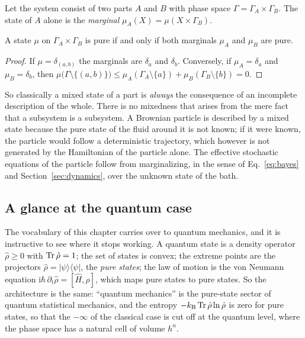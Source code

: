 Let the system consist of two parts $A$ and $B$ with phase space $\Gamma=\Gamma_A\times\Gamma_B$. The state of $A$ alone is the \emph{marginal} $\mu_A(X)=\mu(X\times\Gamma_B)$.

\begin{proposition}\label{prop:marginals}
A state $\mu$ on $\Gamma_A\times\Gamma_B$ is pure if and only if both marginals $\mu_A$ and $\mu_B$ are pure.
\end{proposition}

\begin{proof}
If $\mu=\delta_{(a,b)}$ the marginals are $\delta_a$ and $\delta_b$. Conversely, if $\mu_A=\delta_a$ and $\mu_B=\delta_b$, then $\mu\bigl(\Gamma\setminus\{(a,b)\}\bigr)\le\mu_A(\Gamma_A\setminus\{a\})+\mu_B(\Gamma_B\setminus\{b\})=0$.
\end{proof}

So classically a mixed state of a part is \emph{always} the consequence of an incomplete description of the whole. There is no mixedness that arises from the mere fact that a subsystem is a subsystem. A Brownian particle is described by a mixed state because the pure state of the fluid around it is not known; if it were known, the particle would follow a deterministic trajectory, which however is not generated by the Hamiltonian of the particle alone. The effective stochastic equations of the particle follow from marginalizing, in the sense of Eq.~\eqref{eq:bayes} and Section~\ref{sec:dynamics}, over the unknown state of the bath.

\subsection{A glance at the quantum case}
\label{sec:quantum}

The vocabulary of this chapter carries over to quantum mechanics, and it is instructive to see where it stops working. A quantum state is a density operator $\hat\rho\ge0$ with $\operatorname{Tr}\hat\rho=1$; the set of states is convex; the extreme points are the projectors $\hat\rho=|\psi\rangle\langle\psi|$, the \emph{pure states}; the law of motion is the von Neumann equation $\mathrm i\hbar\,\partial_t\hat\rho=[\hat H,\hat\rho]$, which maps pure states to pure states. So the architecture is the same: ``quantum mechanics'' is the pure-state sector of quantum statistical mechanics, and the entropy $-k_{\mathrm B}\operatorname{Tr}\hat\rho\ln\hat\rho$ is zero for pure states, so that the $-\infty$ of the classical case is cut off at the quantum level, where the phase space has a natural cell of volume $h^n$.

